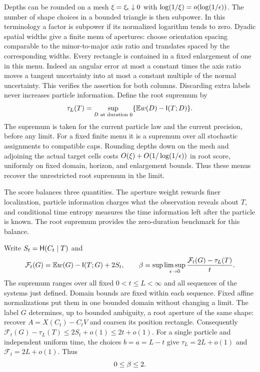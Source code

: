 Depths can be rounded on a mesh $\xi=\xi_\epsilon\downarrow0$ with
$\log(1/\xi)=o(\log(1/\epsilon))$.  The number of shape choices in a bounded
triangle is then subpower.  In this terminology a factor is subpower if
its normalized logarithm tends to zero.  Dyadic spatial widths give a
finite menu of apertures: choose orientation spacing comparable to the
minor-to-major axis ratio and translates spaced by the corresponding
widths.  Every rectangle is contained in a fixed enlargement of one in
this menu.  Indeed an angular error at most a constant times the axis
ratio moves a tangent uncertainty into at most a constant multiple of
the normal uncertainty.  This verifies the assertion for both columns.
Discarding extra labels never increases particle information.  Define the
root supremum by
\[
 \tau_L(T)=\sup_{D\text{ at duration }0}
       \{\mathbb E w(D)-\mathsf I(T;D)\}.
\]
The supremum is taken for the current particle law and the current
precision, before any limit.  For a fixed finite menu it is a supremum
over all stochastic assignments to compatible caps.  Rounding depths down
on the mesh and adjoining the actual target cells costs
$O(\xi)+O(1/\log(1/\epsilon))$ in root score, uniformly on fixed domain,
horizon, and enlargement bounds.  Thus these menus recover the unrestricted
root supremum in the limit.

The score balances three quantities. The aperture weight rewards finer
localization, particle information charges what the observation reveals
about $T$, and conditional time entropy measures the time information
left after the particle is known. The root supremum provides the
zero-duration benchmark for this balance.

Write $S_t=\mathsf H(C_t\mid T)$ and
\begin{equation}
 \mathcal F_t(G)=\mathbb E w(G)-\mathsf I(T;G)+2S_t,
 \qquad
 \beta=\sup\limsup_{\epsilon\to0}
       \frac{\mathcal F_t(G)-\tau_L(T)}{t}.
 \label{eq:classical-score}
\end{equation}
The supremum ranges over all fixed $0<t\le L<\infty$ and all sequences
of the systems just defined.  Domain bounds are fixed within each
sequence.  Fixed affine normalizations put them in one bounded domain
without changing a limit.  The label $G$ determines, up to bounded
ambiguity, a root aperture of the same shape: recover $A=X(C_t)-C_tV$
and coarsen its position rectangle.  Consequently
$\mathcal F_t(G)-\tau_L(T)\le2S_t+o(1)\le2t+o(1)$.
For a single particle and independent uniform time, the choices
$b=a=L-t$ give $\tau_L=2L+o(1)$ and $\mathcal F_t=2L+o(1)$.
Thus
\begin{equation}
 0\le\beta\le2.
 \label{eq:classical-provisional}
\end{equation}

